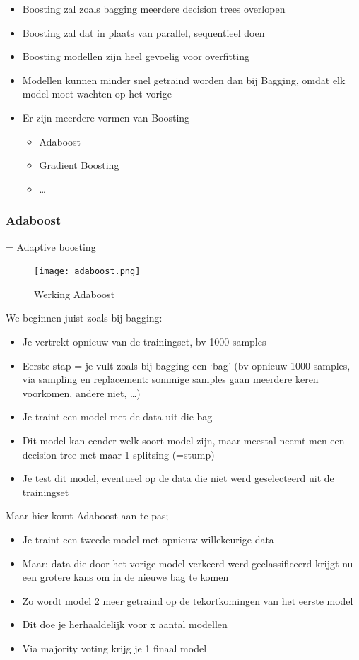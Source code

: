 \documentclass{article}
\begin{document}
\begin{itemize}
    \item Boosting zal zoals bagging meerdere decision trees overlopen
    \item Boosting zal dat in plaats van parallel, sequentieel doen
    \item Boosting modellen zijn heel gevoelig voor overfitting
    \item Modellen kunnen minder snel getraind worden dan bij Bagging, omdat elk model moet wachten op het vorige
    \item Er zijn meerdere vormen van Boosting
    \begin{itemize}
        \item Adaboost
        \item Gradient Boosting
        \item \dots
    \end{itemize}
\end{itemize}

\subsubsection{Adaboost}

= Adaptive boosting

\begin{figure}[H]
    \centering
    \texttt{[image: adaboost.png]}
    \caption{Werking Adaboost}
\end{figure}

We beginnen juist zoals bij bagging:

\begin{itemize}
    \item Je vertrekt opnieuw van de trainingset, bv 1000 samples
    \item Eerste stap = je vult zoals bij bagging een `bag' (bv opnieuw 1000 samples, via sampling en replacement: sommige samples gaan meerdere keren voorkomen, andere niet, \dots)
    \item Je traint een model met de data uit die bag
    \item Dit model kan eender welk soort model zijn, maar meestal neemt men een decision tree met maar 1 splitsing (=stump)
    \item Je test dit model, eventueel op de data die niet werd geselecteerd uit de trainingset
\end{itemize}

Maar hier komt Adaboost aan te pas;

\begin{itemize}
    \item Je traint een tweede model met opnieuw willekeurige data
    \item Maar: data die door het vorige model verkeerd werd geclassificeerd krijgt nu een grotere kans om in de nieuwe bag te komen
    \item Zo wordt model 2 meer getraind op de tekortkomingen van het eerste model 
    \item Dit doe je herhaaldelijk voor x aantal modellen
    \item Via majority voting krijg je 1 finaal model
\end{itemize}
\end{document}
